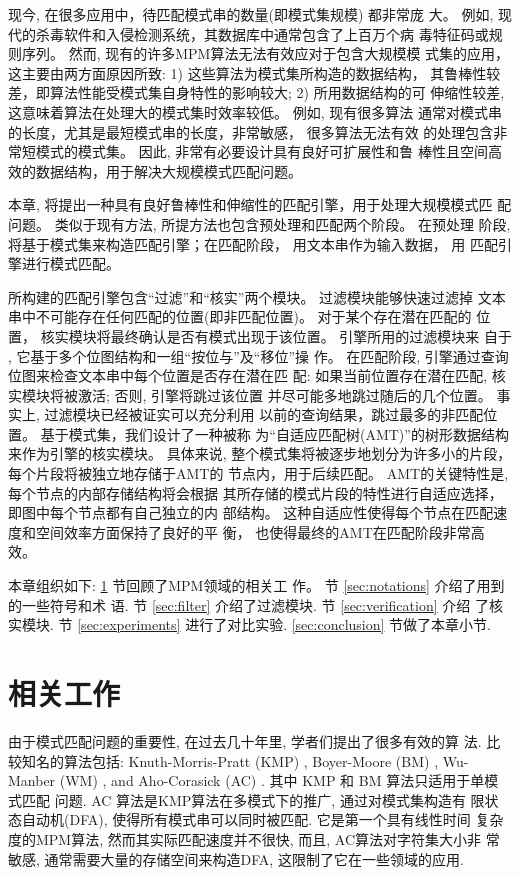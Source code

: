 现今, 在很多应用中，待匹配模式串的数量(即模式集规模) 都非常庞
大。 例如, 现代的杀毒软件和入侵检测系统，其数据库中通常包含了上百万个病
毒特征码或规则序列。 然而, 现有的许多MPM算法无法有效应对于包含大规模模
式集的应用，这主要由两方面原因所致: 1) 这些算法为模式集所构造的数据结构，
其鲁棒性较差，即算法性能受模式集自身特性的影响较大; 2) 所用数据结构的可
伸缩性较差, 这意味着算法在处理大的模式集时效率较低。 例如, 现有很多算法
通常对模式串的长度，尤其是最短模式串的长度，非常敏感， 很多算法无法有效
的处理包含非常短模式的模式集。 因此, 非常有必要设计具有良好可扩展性和鲁
棒性且空间高效的数据结构，用于解决大规模模式匹配问题。

本章, 将提出一种具有良好鲁棒性和伸缩性的匹配引擎，用于处理大规模模式匹
配问题。 类似于现有方法, 所提方法也包含预处理和匹配两个阶段。 在预处理
阶段,将基于模式集来构造匹配引擎；在匹配阶段， 用文本串作为输入数据， 用
匹配引擎进行模式匹配。


所构建的匹配引擎包含“过滤”和“核实”两个模块。 过滤模块能够快速过滤掉
文本串中不可能存在任何匹配的位置(即非匹配位置)。 对于某个存在潜在匹配的
位置， 核实模块将最终确认是否有模式出现于该位置。 引擎所用的过滤模块来
自于 \cite{Lee2013}, 它基于多个位图结构和一组“按位与”及“移位”操
作。 在匹配阶段, 引擎通过查询位图来检查文本串中每个位置是否存在潜在匹
配: 如果当前位置存在潜在匹配, 核实模块将被激活; 否则, 引擎将跳过该位置
并尽可能多地跳过随后的几个位置。 事实上, 过滤模块已经被证实可以充分利用
以前的查询结果，跳过最多的非匹配位置。 基于模式集，我们设计了一种被称
为“自适应匹配树(AMT)”的树形数据结构来作为引擎的核实模块。 具体来说,
整个模式集将被逐步地划分为许多小的片段， 每个片段将被独立地存储于AMT的
节点内，用于后续匹配。 AMT的关键特性是, 每个节点的内部存储结构将会根据
其所存储的模式片段的特性进行自适应选择，即图中每个节点都有自己独立的内
部结构。 这种自适应性使得每个节点在匹配速度和空间效率方面保持了良好的平
衡， 也使得最终的AMT在匹配阶段非常高效。

本章组织如下: \ref{sec:related works} 节回顾了MPM领域的相关工
作。 节 \ref{sec:notations} 介绍了用到的一些符号和术
语. 节 \ref{sec:filter} 介绍了过滤模块. 节 \ref{sec:verification} 介绍
了核实模块. 节 \ref{sec:experiments} 进行了对比实验.
\ref{sec:conclusion} 节做了本章小节.

\section{相关工作}
\label{sec:related works}

由于模式匹配问题的重要性, 在过去几十年里, 学者们提出了很多有效的算
法. 比较知名的算法包括: Knuth-Morris-Pratt (\textsf{KMP})
\cite{Knuth1977}, Boyer-Moore (\textsf{BM}) \cite{Boyer1977},
Wu-Manber (\textsf{WM}) \cite{Wu1994}, and Aho-Corasick (\textsf{AC})
\cite{Aho1975}. 其中 \textsf{KMP} 和 \textsf{BM} 算法只适用于单模式匹配
问题.  \textsf{AC} 算法是KMP算法在多模式下的推广, 通过对模式集构造有
限状态自动机(DFA), 使得所有模式串可以同时被匹配. 它是第一个具有线性时间
复杂度的MPM算法, 然而其实际匹配速度并不很快, 而且, AC算法对字符集大小非
常敏感, 通常需要大量的存储空间来构造DFA, 这限制了它在一些领域的应用.

